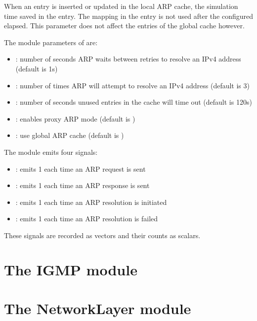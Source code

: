 When an entry is inserted or updated in the local ARP cache,
the simulation time saved in the entry. The mapping in the
entry is not used after the configured 
elapsed. This parameter does not affect the entries of
the global cache however.


The module parameters of  are:

\begin{itemize}
  \item {}: number of seconds ARP waits between retries to resolve an IPv4 address (default is 1s)
  \item {}: number of times ARP will attempt to resolve an IPv4 address (default is 3)
  \item {}: number of seconds unused entries in the cache will time out (default is 120s)
  \item {}: enables proxy ARP mode (default is )
  \item {}: use global ARP cache (default is )
\end{itemize}

The  module emits four signals:

\begin{itemize}
  \item {}: emits 1 each time an ARP request is sent
  \item {}: emits 1 each time an ARP response is sent
  \item {}: emits 1 each time an ARP resolution is initiated 
  \item {}: emits 1 each time an ARP resolution is failed
\end{itemize}

These signals are recorded as vectors and their counts as scalars.


\section{The IGMP module}


\section{The NetworkLayer module}


